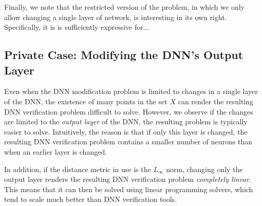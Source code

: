 \documentclass{easychair}
\newcommand{\guy}[1]{\marginpar{\textcolor{orange}{Guy: #1}}}
\begin{document}
Finally, we note that the restricted version of the problem, in which
we only allow changing a single layer of network, is interesting in
its own right. Specifically, it is is sufficiently expressive for...
\guy{TODO: justify why this is interesting}


\subsection{Private Case: Modifying the DNN's Output Layer}
\label{sec:outputLayer}

Even when the DNN modification problem is limited to changes in a
single layer of the DNN, the existence of many points in the set $X$
can render the resulting DNN verification problem difficult to
solve. However,  we observe if the changes are limited to the \emph{output
  layer} of the DNN, the resulting problem is typically easier to
solve. Intuitively, the reason is that if only this layer is changed,
the resulting DNN verification problem contains a smaller number of
neurons than when an earlier layer is changed.

In addition, if the distance metric in use is the $L_\infty$ norm,
changing only the output layer renders the resulting DNN verification
problem \emph{completely linear}. This means that it can then be solved using
linear programming solvers, which tend to scale much better than DNN
verification tools.
\end{document}

